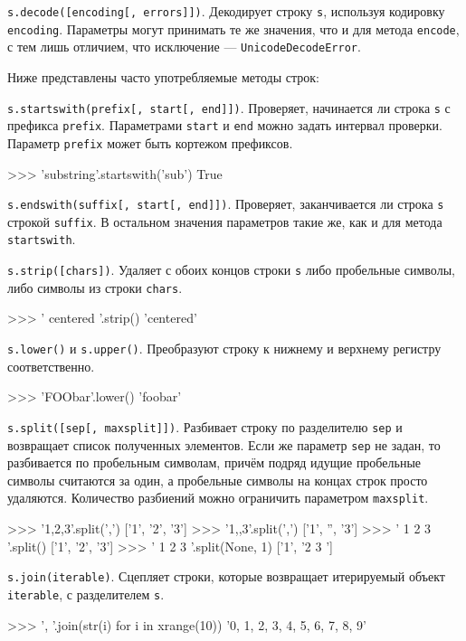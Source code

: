 \lstinline{s.decode([encoding[, errors]])}. Декодирует строку \lstinline{s}, используя кодировку \lstinline{encoding}. Параметры могут принимать те же значения, что и для метода \lstinline{encode}, с тем лишь отличием, что исключение — \lstinline{UnicodeDecodeError}.

Ниже представлены часто употребляемые методы строк:

\lstinline{s.startswith(prefix[, start[, end]])}. Проверяет, начинается ли строка \lstinline{s} с префикса \lstinline{prefix}. Параметрами \lstinline{start} и \lstinline{end} можно задать интервал проверки. Параметр \lstinline{prefix} может быть кортежом префиксов.
\begin{pylst}{}{}
>>> 'substring'.startswith('sub')
True
\end{pylst}

\lstinline{s.endswith(suffix[, start[, end]])}. Проверяет, заканчивается ли строка \lstinline{s} строкой \lstinline{suffix}. В остальном значения параметров такие же, как и для метода \lstinline{startswith}.

\lstinline{s.strip([chars])}. Удаляет с обоих концов строки \lstinline{s} либо пробельные символы, либо символы из строки \lstinline{chars}.
\begin{pylst}{}{}
>>> '      centered      '.strip()
'centered'
\end{pylst}

\lstinline{s.lower()} и \lstinline{s.upper()}. Преобразуют строку к нижнему и верхнему регистру соответственно.
\begin{pylst}{}{}
>>> 'FOObar'.lower()
'foobar'
\end{pylst}

\lstinline{s.split([sep[, maxsplit]])}. Разбивает строку по разделителю \lstinline{sep} и возвращает список полученных элементов. Если же параметр \lstinline{sep} не задан, то разбивается по пробельным символам, причём подряд идущие пробельные символы считаются за один, а пробельные символы на концах строк просто удаляются. Количество разбиений можно ограничить параметром \lstinline{maxsplit}.
\begin{pylst}{}{}
>>> '1,2,3'.split(',')
['1', '2', '3']
>>> '1,,3'.split(',')
['1', '', '3']
>>> ' 1    2  3 '.split()
['1', '2', '3']
>>> ' 1    2  3 '.split(None, 1)
['1', '2  3 ']
\end{pylst}

\lstinline{s.join(iterable)}. Сцепляет строки, которые возвращает итерируемый объект \lstinline{iterable}, с разделителем \lstinline{s}.
\begin{pylst}{}{}
>>> ', '.join(str(i) for i in xrange(10))
'0, 1, 2, 3, 4, 5, 6, 7, 8, 9'
\end{pylst}

